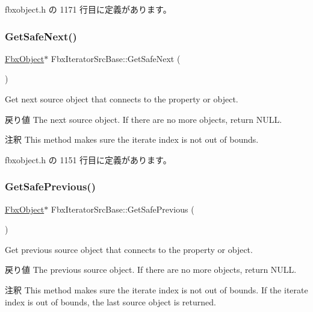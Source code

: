  fbxobject.\+h の 1171 行目に定義があります。

\mbox{\label{class_fbx_iterator_src_base_ad0bb49ec584418f0325bc4f05a21ed04}} 
\subsubsection{\texorpdfstring{Get\+Safe\+Next()}{GetSafeNext()}}
{\footnotesize\ttfamily \hyperlink{class_fbx_object}{Fbx\+Object}$\ast$ Fbx\+Iterator\+Src\+Base\+::\+Get\+Safe\+Next (\begin{DoxyParamCaption}{ }\end{DoxyParamCaption})\hspace{0.3cm}{\ttfamily [inline]}}

Get next source object that connects to the property or object. \begin{DoxyReturn}{戻り値}
The next source object. If there are no more objects, return N\+U\+LL. 
\end{DoxyReturn}
\begin{DoxyRemark}{注釈}
This method makes sure the iterate index is not out of bounds. 
\end{DoxyRemark}


 fbxobject.\+h の 1151 行目に定義があります。

\mbox{\label{class_fbx_iterator_src_base_a9ddd3ce318c6db15ec02ede17541f9ef}} 
\subsubsection{\texorpdfstring{Get\+Safe\+Previous()}{GetSafePrevious()}}
{\footnotesize\ttfamily \hyperlink{class_fbx_object}{Fbx\+Object}$\ast$ Fbx\+Iterator\+Src\+Base\+::\+Get\+Safe\+Previous (\begin{DoxyParamCaption}{ }\end{DoxyParamCaption})\hspace{0.3cm}{\ttfamily [inline]}}

Get previous source object that connects to the property or object. \begin{DoxyReturn}{戻り値}
The previous source object. If there are no more objects, return N\+U\+LL. 
\end{DoxyReturn}
\begin{DoxyRemark}{注釈}
This method makes sure the iterate index is not out of bounds. If the iterate index is out of bounds, the last source object is returned. 
\end{DoxyRemark}


